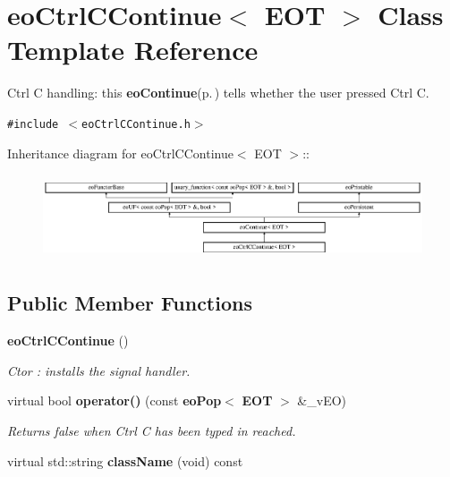\section{eo\-Ctrl\-CContinue$<$ EOT $>$ Class Template Reference}
\label{classeo_ctrl_c_continue}
Ctrl C handling: this {\bf eo\-Continue}{\rm (p.\,\pageref{classeo_continue})} tells whether the user pressed Ctrl C.  


{\tt \#include $<$eo\-Ctrl\-CContinue.h$>$}

Inheritance diagram for eo\-Ctrl\-CContinue$<$ EOT $>$::\begin{figure}[H]
\begin{center}
\leavevmode
\includegraphics[height=2.52252cm]{classeo_ctrl_c_continue}
\end{center}
\end{figure}
\subsection*{Public Member Functions}
\begin{CompactItemize}
\item 
{\bf eo\-Ctrl\-CContinue} ()\label{classeo_ctrl_c_continue_a0}

\begin{CompactList}\small\item\em Ctor : installs the signal handler. \item\end{CompactList}\item 
virtual bool {\bf operator()} (const {\bf eo\-Pop}$<$ {\bf EOT} $>$ \&\_\-v\-EO)\label{classeo_ctrl_c_continue_a1}

\begin{CompactList}\small\item\em Returns false when Ctrl C has been typed in reached. \item\end{CompactList}\item 
virtual std::string {\bf class\-Name} (void) const \label{classeo_ctrl_c_continue_a2}

\end{CompactItemize}



